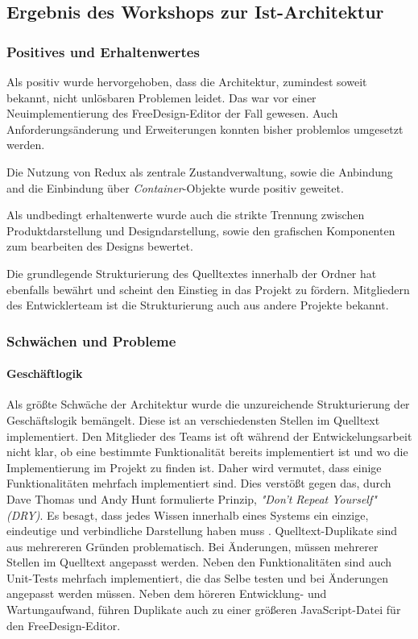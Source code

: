 \subsection{Ergebnis des Workshops zur Ist-Architektur}

\subsubsection{Positives und Erhaltenwertes}

Als positiv wurde hervorgehoben, dass die Architektur, zumindest soweit bekannt, nicht unlösbaren Problemen leidet. 
Das war vor einer Neuimplementierung des FreeDesign-Editor der Fall gewesen. 
Auch Anforderungsänderung und Erweiterungen konnten bisher problemlos umgesetzt werden. 

Die Nutzung von Redux als zentrale Zustandverwaltung, sowie die Anbindung and die Einbindung über \emph{Container}-Objekte wurde positiv geweitet. 

Als undbedingt erhaltenwerte wurde auch die strikte Trennung zwischen Produktdarstellung und Designdarstellung, sowie den grafischen Komponenten zum bearbeiten des Designs bewertet. 

Die grundlegende Strukturierung des Quelltextes innerhalb der Ordner hat ebenfalls bewährt und scheint den Einstieg in das Projekt zu fördern. 
Mitgliedern des Entwicklerteam ist die Strukturierung auch aus andere Projekte bekannt.

\subsubsection{Schwächen und Probleme}
\paragraph{Geschäftlogik}
Als größte Schwäche der Architektur wurde die unzureichende Strukturierung der Geschäftslogik bemängelt. Diese ist an verschiedensten Stellen im Quelltext implementiert. Den Mitglieder des Teams ist oft während der Entwickelungsarbeit nicht klar, ob eine bestimmte Funktionalität bereits implementiert ist und wo die Implementierung im Projekt zu finden ist. 
Daher wird vermutet, dass einige Funktionalitäten mehrfach implementiert sind. 
Dies verstößt gegen das, durch Dave Thomas und Andy Hunt formulierte Prinzip, \emph{"Don’t Repeat Yourself" (DRY)}. Es besagt, dass jedes Wissen innerhalb eines Systems ein einzige, eindeutige und verbindliche Darstellung haben muss \autocite[vgl.][30 - 31]{ThomasAndHunt2020}.  
Quelltext-Duplikate sind aus mehrereren Gründen problematisch. Bei Änderungen, müssen mehrerer Stellen im Quelltext angepasst werden. Neben den Funktionalitäten sind auch Unit-Tests mehrfach implementiert, die das Selbe testen und bei Änderungen angepasst werden müssen. Neben dem höreren Entwicklung- und Wartungaufwand, führen Duplikate auch zu einer größeren JavaScript-Datei für den FreeDesign-Editor. 

